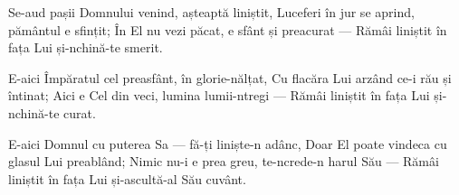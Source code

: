 \beginverse
Se-aud pașii Domnului venind, așteaptă liniștit,
Luceferi în jur se aprind, pământul e sfințit;
În El nu vezi păcat, e sfânt și preacurat —
Rămâi liniștit în fața Lui și-nchină-te smerit.
\endverse

\beginverse
E-aici Împăratul cel preasfânt, în glorie-nălțat,
Cu flacăra Lui arzând ce-i rău și întinat;
Aici e Cel din veci, lumina lumii-ntregi —
Rămâi liniștit în fața Lui și-nchină-te curat.
\endverse

\beginverse
E-aici Domnul cu puterea Sa — fă-ți liniște-n adânc,
Doar El poate vindeca cu glasul Lui preablând;
Nimic nu-i e prea greu, te-ncrede-n harul Său —
Rămâi liniștit în fața Lui și-ascultă-al Său cuvânt.
\endverse
\endsong